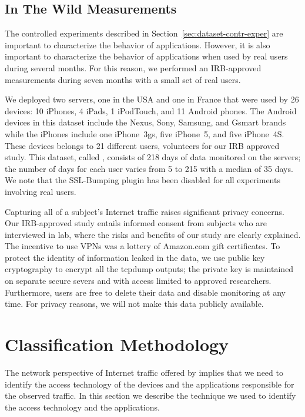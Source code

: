 
\subsection{In The Wild Measurements}
\label{sec:dataset-wild-measurements}

The controlled experiments described in
Section~\ref{sec:dataset-contr-exper} are important to characterize
the behavior of applications. However, it is also important to
characterize the behavior of applications when used by real users
during several months. For this reason, we performed an IRB-approved
measurements during seven months with a small set of real users. 

We deployed two \platname servers, one in the USA and one
in France that were used by 26 devices: 10 iPhones, 4
iPads, 1 iPodTouch, and 11 Android phones.  The Android devices in
this dataset include the Nexus, Sony, Samsung, and Gsmart brands while
the iPhones include one iPhone~3gs, five iPhone~5, and five iPhone~4S.
These devices belongs to 21 different users, volunteers for our IRB approved
study.  This dataset, called \mobWild, consists of 218 days of data
monitored on the \platname{} servers; the number of days for each
user varies from 5 to 215 with a median of 35 days.  We note that the
SSL-Bumping plugin has been disabled for all experiments involving
real users.

Capturing all of a subject's Internet traffic raises significant
privacy concerns.  Our IRB-approved study entails informed consent
from subjects who are interviewed in lab, where the risks and benefits
of our study are clearly explained.  The incentive to use VPNs was a
lottery of Amazon.com gift certificates. To protect the identity of
information leaked in the data, we use public key cryptography to
encrypt all the tcpdump outputs; the private key is maintained on
separate secure severs and with access limited to approved
researchers.  Furthermore, users are free to delete their data and
disable monitoring at any time.  For privacy reasons, we will not make
this data publicly available.

\section{Classification Methodology}
\label{sec:classification-methodology}

The network perspective of Internet traffic offered by \platname
implies that we need to identify the access technology of the devices
and the applications responsible for the observed traffic.  In this
section we describe the technique we used to identify the access
technology and the applications.

